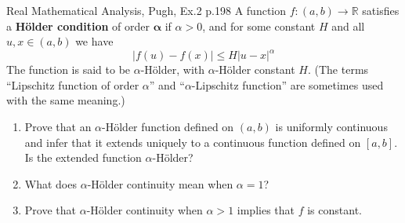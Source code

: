 \begin{problem}{}{}{Real Mathematical Analysis, Pugh, Ex.2 p.198}
A function $f : (a,b) \to \mathbb{R}$ satisfies a \textbf{H\"older condition}
of order $\boldsymbol{\alpha}$ if $\alpha > 0$, and for some constant $H$
and all $u,x \in (a,b)$ we have
\[
    |f(u) - f(x)| \le H|u - x|^\alpha
\]
The function is said to be $\alpha$-H\"older, with $\alpha$-H\"older
constant $H$. (The terms ``Lipschitz function of order $\alpha$'' and
``$\alpha$-Lipschitz function'' are sometimes used with the same meaning.)

\begin{enumerate}
    \item[(a)] Prove that an $\alpha$-H\"older function defined on $(a,b)$
          is uniformly continuous and infer that it extends uniquely to a
          continuous function defined on $[a, b]$. Is the extended function
          $\alpha$-H\"older?

    \item[(b)] What does $\alpha$-H\"older continuity mean when $\alpha = 1$?

    \item[(c)] Prove that $\alpha$-H\"older continuity when $\alpha > 1$
          implies that $f$ is constant.
\end{enumerate}
\end{problem}

